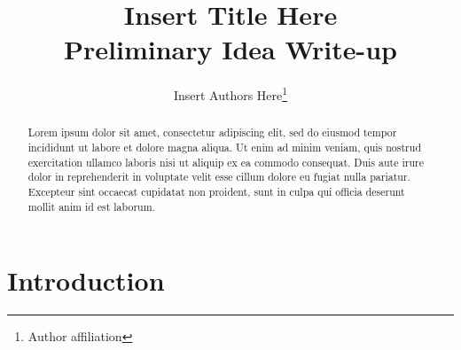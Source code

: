 \newcommand*{\MyHeaderPath}{.}%
\newcommand*{\PathToAssets}{../assets}%
\newcommand*{\PathToOutput}{../output/}%








\title{
Insert Title Here
\\{\color{blue} \large Preliminary Idea Write-up}
}

\author{
Insert Authors Here\footnote{Author affiliation}
}
\begin{titlepage}
% 
\maketitle


\doublespacing
\begin{abstract}
Lorem ipsum dolor sit amet, consectetur adipiscing elit, sed do eiusmod tempor
incididunt ut labore et dolore magna aliqua. Ut enim ad minim veniam, quis
nostrud exercitation ullamco laboris nisi ut aliquip ex ea commodo consequat.
Duis aute irure dolor in reprehenderit in voluptate velit esse cillum dolore
eu fugiat nulla pariatur. Excepteur sint occaecat cupidatat non proident,
sunt in culpa qui officia deserunt mollit anim id est laborum.
\end{abstract}


\end{titlepage}

\doublespacing
\section{Introduction}

